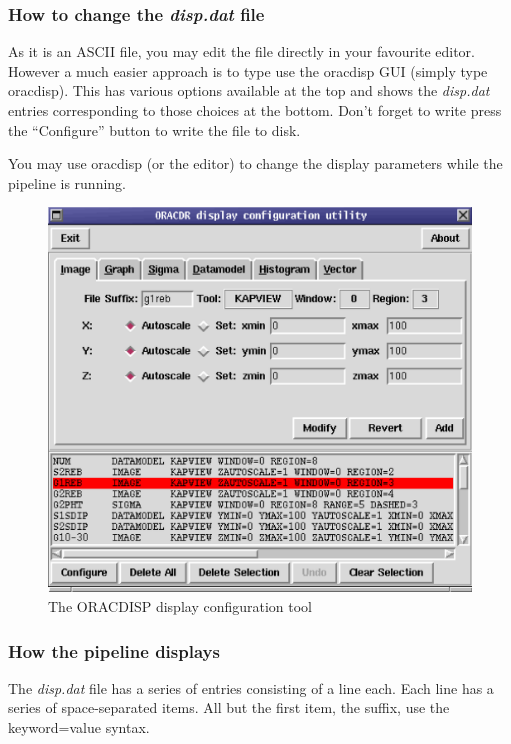 \documentclass[twoside,11pt]{article}
\renewcommand{\_}{\texttt{\symbol{95}}}
\begin{document}
\subsubsection*{How to change the \emph{disp.dat} file\label{The_ORAC-DR_Display_System_How_to_change_the_disp_dat_file}}

As it is an ASCII file, you may edit the file directly in your
favourite editor. However a much easier approach is to type use the
oracdisp GUI (simply type oracdisp). This has various options
available at the top and shows the \emph{disp.dat} entries corresponding to
those choices at the bottom. Don't forget to write press the
``Configure'' button to write the file to disk.



You may use oracdisp (or the editor) to change the display parameters
while the pipeline is running.

\begin{figure}
\includegraphics[width=\textwidth]{sun230_disp.eps}
\caption{The ORACDISP display configuration tool}
\end{figure}

\subsubsection*{How the pipeline displays\label{The_ORAC-DR_Display_System_How_the_pipeline_displays}}

The \emph{disp.dat} file has a series of entries consisting of a line
each. Each line has a series of space-separated items.  All but
the first item, the suffix, use the keyword=value syntax.
\end{document}
